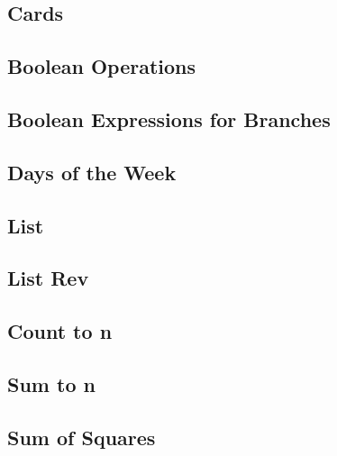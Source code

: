 
\subsection{Cards} \label{cards}


\newpage
\subsection{Boolean Operations} \label{bool_ops}


\newpage
\subsection{Boolean Expressions for Branches} \label{bool_expr}


\newpage
\subsection{Days of the Week} \label{days}


\newpage
\subsection{List} \label{list}


\newpage
\subsection{List Rev} \label{list_rev}


\newpage
\subsection{Count to n} \label{count_to_n}


\newpage
\subsection{Sum to n} \label{sum_to_n}


\newpage
\subsection{Sum of Squares} \label{sum_of_squares}











